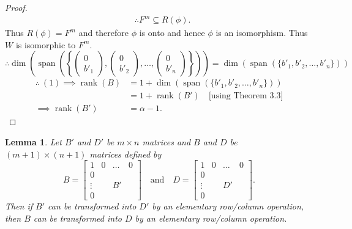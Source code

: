 \documentclass[12pt, a4paper]{article}
\newtheorem{lemma}{Lemma}[section]
\theoremstyle{definition}
\theoremstyle{remark}
\DeclareMathOperator{\Span}{span}
\DeclareMathOperator{\rank}{rank}
\begin{document}
\begin{proof}
\begin{align*}
& \therefore F^m \subseteq R(\phi).
\end{align*}
Thus $R(\phi) = F^m$ and therefore $\phi$ is onto and hence $\phi$ is an isomorphism. Thus $W$ is isomorphic to $F^m$.
\[
\therefore \dim\left(\Span\left(\left\{ \begin{pmatrix} 0 \\ b'_1 \end{pmatrix}, \begin{pmatrix} 0 \\ b'_2 \end{pmatrix}, \dots, \begin{pmatrix} 0 \\ b'_n \end{pmatrix} \right\}\right)\right) = \dim(\Span(\{b'_1, b'_2, \dots, b'_n\}))
\]
\begin{align*}
    \therefore \ (1) \implies \rank(B) &= 1 + \dim(\Span(\{b'_1, b'_2, \dots, b'_n\})) \\
    &= 1 + \rank(B') \quad \text{[using Theorem 3.3]} \\
    \implies \rank(B') &= \alpha - 1.
\end{align*}
\end{proof}

\begin{lemma}
Let $B'$ and $D'$ be $m \times n$ matrices and $B$ and $D$ be $(m+1) \times (n+1)$ matrices defined by
\[
B = \left[
\begin{array}{c|ccc}
1 & 0 & \dots & 0 \\ \hline
0 &   &       &   \\
\vdots & & B'    &   \\
0 &   &       &   
\end{array}
\right]
\quad \text{and} \quad
D = \left[
\begin{array}{c|ccc}
1 & 0 & \dots & 0 \\ \hline
0 &   &       &   \\
\vdots & & D'    &   \\
0 &   &       &   
\end{array}
\right].
\]
Then if $B'$ can be transformed into $D'$ by an elementary row/column operation, then $B$ can be transformed into $D$ by an elementary row/column operation.
\end{lemma}
\end{document}
